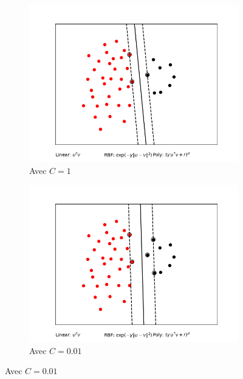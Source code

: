 \documentclass{article}
\begin{document}
\begin{figure}[H]
    \centering
    \captionsetup{justification=centering}
    \begin{subfigure}{0.45\textwidth}
        \centering
        \includegraphics[width=.7\textwidth]{outputs/SVM_C_1.png} 
        \caption{Avec $C=1$}
    \end{subfigure}
    \begin{subfigure}{0.45\textwidth}
        \centering
        \includegraphics[width=.7\textwidth]{outputs/SVM_C_0_01.png}
        \caption{Avec $C=0.01$}

    \end{subfigure}

    \vspace{0cm} %


\end{figure}
\end{document}
